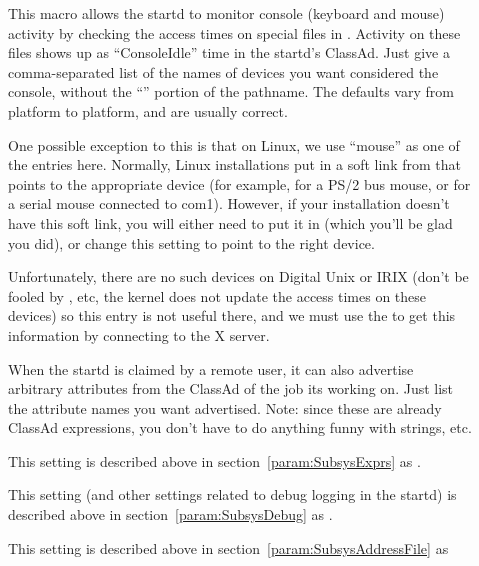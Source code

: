\begin{description}
\item[] \label{param:ConsoleDevices} This
  macro allows the startd to monitor console (keyboard and mouse)
  activity by checking the access times on special files in
  .  Activity on these files shows up as ``ConsoleIdle''
  time in the startd's ClassAd.  Just give a comma-separated list of
  the names of devices you want considered the console, without the
  ``'' portion of the pathname.  The defaults vary from
  platform to platform, and are usually correct.  

  One possible exception to this is that on Linux, we use ``mouse'' as
  one of the entries here.  Normally, Linux installations put in a
  soft link from  that points to the appropriate
  device (for example,  for a PS/2 bus mouse, or
   for a serial mouse connected to com1).  However,
  if your installation doesn't have this soft link, you will either
  need to put it in (which you'll be glad you did), or change this
  setting to point to the right device. 
  
  Unfortunately, there are no such devices on Digital Unix or IRIX
  (don't be fooled by , etc, the kernel does not
  update the access times on these devices) so this entry is not
  useful there, and we must use the  to get this
  information by connecting to the X server.
  
\item[] \label{param:StartdJobExprs} When
  the startd is claimed by a remote user, it can also advertise
  arbitrary attributes from the ClassAd of the job its working on.
  Just list the attribute names you want advertised.  Note: since
  these are already ClassAd expressions, you don't have to do anything
  funny with strings, etc.

\item[] \label{param:StartdExprs} This setting is
  described above in section~\ref{param:SubsysExprs} as
  .

\item[] \label{param:StartdDebug} This setting
  (and other settings related to debug logging in the startd) is
  described above in section~\ref{param:SubsysDebug} as
  .

\item[] \label{param:StartdAddressFile}
  This setting is described above in
  section~\ref{param:SubsysAddressFile} as

\end{description}

